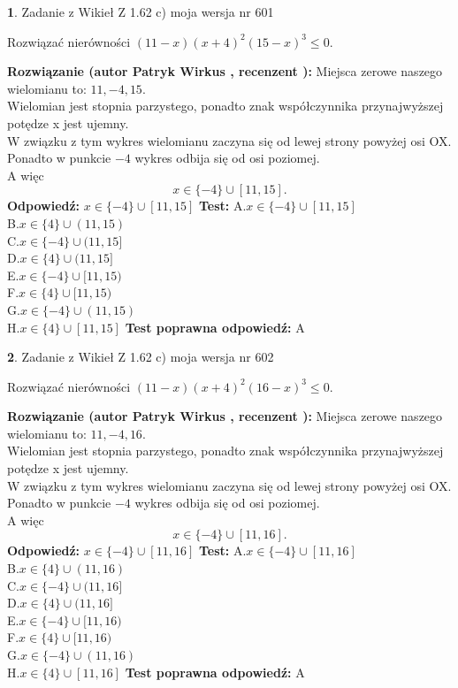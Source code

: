 \documentclass[12pt, a4paper]{article}
\theoremstyle{definition} %
\newtheorem{zad}{}
\newcommand{\zadStart}[1]{\begin{zad}#1\newline}
\newcommand{\zadStop}{\end{zad}}
\newcommand{\rozwStart}[2]{\noindent \textbf{Rozwiązanie (autor #1 , recenzent #2): }\newline}
\newcommand{\rozwStop}{\newline}
\newcommand{\odpStart}{\noindent \textbf{Odpowiedź:}\newline}
\newcommand{\odpStop}{\newline}
\newcommand{\testStart}{\noindent \textbf{Test:}\newline}
\newcommand{\testStop}{\newline}
\newcommand{\kluczStart}{\noindent \textbf{Test poprawna odpowiedź:}\newline}
\newcommand{\kluczStop}{\newline}
\begin{document}
\zadStart{Zadanie z Wikieł Z 1.62 c) moja wersja nr 601}

Rozwiązać nierówności $(11-x)(x+4)^{2}(15-x)^{3}\le0$.
\zadStop
\rozwStart{Patryk Wirkus}{}
Miejsca zerowe naszego wielomianu to: $11, -4, 15$.\\
Wielomian jest stopnia parzystego, ponadto znak współczynnika przy\linebreak najwyższej potędze x jest ujemny.\\ W związku z tym wykres wielomianu zaczyna się od lewej strony powyżej osi OX.\\
Ponadto w punkcie $-4$ wykres odbija się od osi poziomej.\\
A więc $$x \in \{-4\} \cup [11,15].$$
\rozwStop
\odpStart
$x \in \{-4\} \cup [11,15]$
\odpStop
\testStart
A.$x \in \{-4\} \cup [11,15]$\\
B.$x \in \{4\} \cup (11,15)$\\
C.$x \in \{-4\} \cup (11,15]$\\
D.$x \in \{4\} \cup (11,15]$\\
E.$x \in \{-4\} \cup [11,15)$\\
F.$x \in \{4\} \cup [11,15)$\\
G.$x \in \{-4\} \cup (11,15)$\\
H.$x \in \{4\} \cup [11,15]$
\testStop
\kluczStart
A
\kluczStop



\zadStart{Zadanie z Wikieł Z 1.62 c) moja wersja nr 602}

Rozwiązać nierówności $(11-x)(x+4)^{2}(16-x)^{3}\le0$.
\zadStop
\rozwStart{Patryk Wirkus}{}
Miejsca zerowe naszego wielomianu to: $11, -4, 16$.\\
Wielomian jest stopnia parzystego, ponadto znak współczynnika przy\linebreak najwyższej potędze x jest ujemny.\\ W związku z tym wykres wielomianu zaczyna się od lewej strony powyżej osi OX.\\
Ponadto w punkcie $-4$ wykres odbija się od osi poziomej.\\
A więc $$x \in \{-4\} \cup [11,16].$$
\rozwStop
\odpStart
$x \in \{-4\} \cup [11,16]$
\odpStop
\testStart
A.$x \in \{-4\} \cup [11,16]$\\
B.$x \in \{4\} \cup (11,16)$\\
C.$x \in \{-4\} \cup (11,16]$\\
D.$x \in \{4\} \cup (11,16]$\\
E.$x \in \{-4\} \cup [11,16)$\\
F.$x \in \{4\} \cup [11,16)$\\
G.$x \in \{-4\} \cup (11,16)$\\
H.$x \in \{4\} \cup [11,16]$
\testStop
\kluczStart
A
\kluczStop
\end{document}
